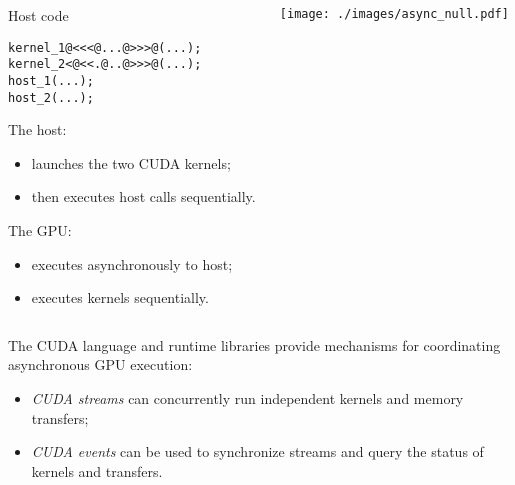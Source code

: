 \documentclass[aspectratio=43]{beamer}
\begin{document}
\begin{frame}[fragile]{}
    \begin{columns}[T]
        \begin{column}{0.5\textwidth}
            \begin{codecolumn}{Host code}
                \begin{lstlisting}[style=boxcudatiny]
kernel_1@<<<@...@>>>@(...);
kernel_2<@<<.@..@>>>@(...);
host_1(...);
host_2(...);
                \end{lstlisting}
            \end{codecolumn}
                The host:
                \begin{itemize}
                    \item launches the two CUDA kernels;
                    \item then executes host calls sequentially.
                \end{itemize}
                The GPU:
                \begin{itemize}
                    \item executes asynchronously to host;
                    \item executes kernels sequentially.
                \end{itemize}
        \end{column}
        \begin{column}{0.5\textwidth}
            \texttt{[image: ./images/async\_null.pdf]}
        \end{column}
    \end{columns}
\end{frame}

\begin{frame}[fragile]{}
    The CUDA language and runtime libraries provide mechanisms for coordinating asynchronous GPU execution:

    \begin{itemize}
        \item \emph{CUDA streams} can concurrently run independent kernels and memory transfers;
        \item \emph{CUDA events} can be used to synchronize streams and query the status of kernels and transfers.
    \end{itemize}

\end{frame}
\end{document}

